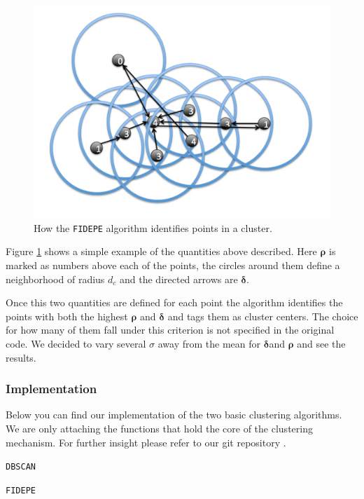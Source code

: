 \documentclass[12pt]{article}
\begin{document}
\begin{figure}[ht]
\centering
\includegraphics[width=0.8\linewidth]{../Plots/fidepe_plots/FIDEPE}
\caption{How the \texttt{FIDEPE} algorithm identifies points in a cluster.}
\label{fig:FIDEPE}
\end{figure}


Figure \ref{fig:FIDEPE} shows a simple example of the quantities above described. Here $\boldsymbol{\rho}$ is marked as numbers above each of the points, the circles around them define a neighborhood of radius $d_c$ and the directed arrows are $\boldsymbol{\delta}$.


Once this two quantities are defined for each point the algorithm identifies the points with both the highest $\boldsymbol{\rho}$ and $\boldsymbol{\delta}$ and tags them as cluster centers. The choice for how many of them fall under this criterion is not specified in the original code. We decided to vary several $\sigma$ away from the mean for $\boldsymbol{\delta}$and $\boldsymbol{\rho}$ and see the results.
\subsubsection{Implementation}

Below you can find our implementation of the two basic clustering algorithms. We are only attaching the functions that hold the core of the clustering mechanism. For further insight please refer to our git repository \cite{git}. 

\begin{center}
\texttt{DBSCAN}
\end{center}

\singlespacing

\doublespacing

\begin{center}
\texttt{FIDEPE}
\end{center}
\end{document}
